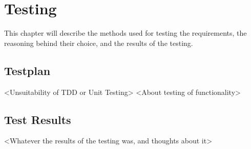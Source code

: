 \section{Testing}
This chapter will describe the methods used for testing the requirements, the reasoning behind their choice, and the results of the testing.
\subsection{Testplan}
<Unsuitability of TDD or Unit Testing>
<About testing of functionality>
\subsection{Test Results}
<Whatever the results of the testing was, and thoughts about it>